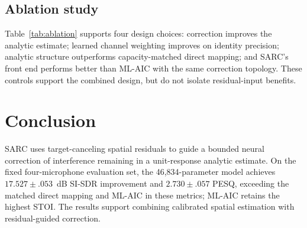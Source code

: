 \documentclass{article}
\begin{document}
\subsection{Ablation study}
\label{sec:ablation}
\begin{table}[t]
\centering
\caption{Ablations of the SARC mechanism on the same evaluation set.}
\label{tab:ablation}
\setlength{\tabcolsep}{3.2pt}
\end{table}

Table~\ref{tab:ablation} supports four design choices: correction improves the analytic estimate; learned channel weighting improves on identity precision; analytic structure outperforms capacity-matched direct mapping; and SARC's front end performs better than ML-AIC with the same correction topology. These controls support the combined design, but do not isolate residual-input benefits.

\section{Conclusion}

SARC uses target-canceling spatial residuals to guide a bounded neural correction of interference remaining in a unit-response analytic estimate. On the fixed four-microphone evaluation set, the 46,834-parameter model achieves $17.527\!\pm\!.053$~dB SI-SDR improvement and $2.730\!\pm\!.057$ PESQ, exceeding the matched direct mapping and ML-AIC in these metrics; ML-AIC retains the highest STOI. The results support combining calibrated spatial estimation with residual-guided correction.

\clearpage

\balance


\end{document}
